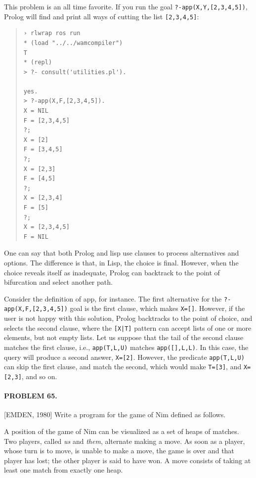 \documentclass[a4paper,12pt]{book}
\begin{document}
This problem is an all time favorite. If you run the
goal \verb|?-app(X,Y,[2,3,4,5])|, Prolog will find and
print all ways of cutting the list \verb|[2,3,4,5]|:
\begin{quote}
\begin{verbatim}
› rlwrap ros run
* (load "../../wamcompiler")
T
* (repl)
> ?- consult('utilities.pl').

yes.
> ?-app(X,F,[2,3,4,5]).
X = NIL
F = [2,3,4,5]
?;
X = [2]
F = [3,4,5]
?;
X = [2,3]
F = [4,5]
?;
X = [2,3,4]
F = [5]
?;
X = [2,3,4,5]
F = NIL
\end{verbatim}
\end{quote}

One can say that both Prolog and lisp use clauses to
process alternatives and options. The difference is
that, in Lisp, the choice is final. However, when
the choice reveals itself as inadequate, Prolog can
backtrack to the point of bifurcation and select
another path.

Consider the definition of app, for instance. The
first alternative for the \verb|?-app(X,F,[2,3,4,5])|
goal is the first clause, which makes \verb|X=[]|.
However, if the user is not happy with this solution,
Prolog backtracks to the point of choice, and selects
the second clause, where the \verb/[X|T]/ pattern can
accept lists of one or more elements, but not empty
lists. Let us suppose that the tail of the second
clause matches the first clause, i.e., \verb|app(T,L,U)|
matches \verb|app([],L,L)|. In this case, the query
will produce a second answer, \verb|X=[2]|. However,
the predicate \verb|app(T,L,U)| can skip the first
clause, and match the second, which would make
\verb|T=[3]|, and \verb|X=[2,3]|, and so on.

\paragraph{PROBLEM 65.} [EMDEN, 1980] Write a program for
the game of Nim defined as follows.

A position of the game of Nim can be visualized as a set of
heaps of matches. Two players, called {\em us} and {\em them},
alternate making a move. As soon as a player, whose turn is to
move, is unable to make a move, the game is over and that player
has lost; the other player is said to have won. A move consists
of taking at least one match from exactly one heap.
\end{document}
